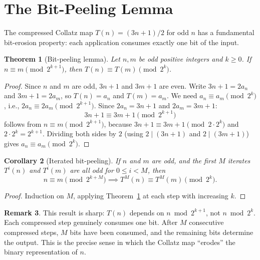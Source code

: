 \documentclass{CUP-JNL-FMP}%
\newtheorem{theorem}{Theorem}[section]
\newtheorem{corollary}[theorem]{Corollary}
\theoremstyle{definition}
\newtheorem{remark}[theorem]{Remark}
\numberwithin{equation}{section}
\begin{document}
\section{The Bit-Peeling Lemma}\label{sec:bitpeel}

The compressed Collatz map $T(n) = (3n+1)/2$ for odd $n$ has a fundamental
bit-erosion property: each application consumes exactly one bit of the input.

\begin{theorem}[Bit-peeling lemma]\label{thm:bitpeel}
  Let $n, m$ be odd positive integers and $k \geq 0$. If
  $n \equiv m \pmod{2^{k+1}}$, then $T(n) \equiv T(m) \pmod{2^k}$.
\end{theorem}

\begin{proof}
  Since $n$ and $m$ are odd, $3n+1$ and $3m+1$ are even. Write $3n+1 = 2a_n$
  and $3m+1 = 2a_m$, so $T(n) = a_n$ and $T(m) = a_m$. We need
  $a_n \equiv a_m \pmod{2^k}$, i.e., $2a_n \equiv 2a_m \pmod{2^{k+1}}$.
  Since $2a_n = 3n+1$ and $2a_m = 3m+1$:
  \[
    3n + 1 \equiv 3m + 1 \pmod{2^{k+1}}
  \]
  follows from $n \equiv m \pmod{2^{k+1}}$, because
  $3n + 1 \equiv 3m + 1 \pmod{2 \cdot 2^k}$ and
  $2 \cdot 2^k = 2^{k+1}$. Dividing both sides by $2$ (using
  $2 \mid (3n+1)$ and $2 \mid (3m+1)$) gives $a_n \equiv a_m \pmod{2^k}$.
\end{proof}

\begin{corollary}[Iterated bit-peeling]\label{cor:iterated}
  If $n$ and $m$ are odd, and the first $M$ iterates $T^i(n)$ and $T^i(m)$
  are all odd for $0 \leq i < M$, then
  \[
    n \equiv m \pmod{2^{k+M}} \implies T^M(n) \equiv T^M(m) \pmod{2^k}.
  \]
\end{corollary}

\begin{proof}
  Induction on $M$, applying Theorem~\ref{thm:bitpeel} at each step with
  increasing $k$.
\end{proof}

\begin{remark}
  This result is sharp: $T(n)$ depends on $n \bmod 2^{k+1}$, not $n \bmod 2^k$.
  Each compressed step genuinely consumes one bit. After $M$ consecutive compressed
  steps, $M$ bits have been consumed, and the remaining bits determine the output.
  This is the precise sense in which the Collatz map ``erodes'' the binary
  representation of $n$.
\end{remark}
\end{document}
